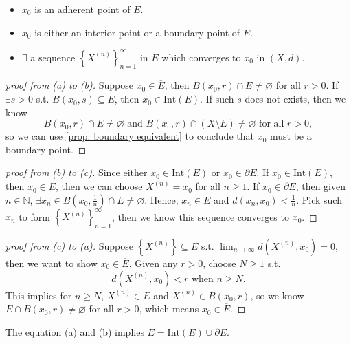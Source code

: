 \begin{proposition}[TFAE]
    \vphantom{text}
    \begin{itemize}
        \item [(a)] \(x_0\) is an adherent point of \(E\). 
        \item [(b)] \(x_0\) is either an interior point or a boundary point of \(E\). 
        \item [(c)] \(\exists \) a sequence \(\left\{ X^{(n)} \right\}_{n=1}^{\infty}  \) in \(E\) which converges to \(x_0\) in \((X, d)\).        
    \end{itemize}
\end{proposition}
\begin{proof}[proof from (a) to (b)]
    Suppose \(x_0 \in \overline{E} \), then \(B(x_0, r) \cap E \neq \varnothing \) for all \(r > 0\). If \(\exists s > 0\) s.t. \(B(x_0, s) \subseteq E\), then \(x_0 \in \mathrm{Int}(E)\). If such \(s\) does not exists, then we know
    \[
        B(x_0, r) \cap E \neq \varnothing \text{ and } B(x_0, r) \cap (X \setminus E) \neq \varnothing \text{ for all } r>0,
    \]
    so we can use \autoref{prop: boundary equivalent} to conclude that \(x_0\) must be a boundary point.        
\end{proof}
\begin{proof}[proof from (b) to (c)]
    Since either \(x_0 \in \mathrm{Int}(E) \) or \(x_0 \in \partial E\). If \(x_0 \in \mathrm{Int}(E) \), then \(x_0 \in E\), then we can choose \(X^{(n)} = x_0\) for all \(n \ge 1\). If \(x_0 \in \partial E\), then given \(n \in \mathbb{N} \), \(\exists x_n \in B\left( x_0, \frac{1}{n} \right) \cap E \neq \varnothing \). Hence, \(x_n \in E\) and \(d(x_n, x_0) < \frac{1}{n}\). Pick such \(x_n\) to form \(\left\{ X^{(n)} \right\}_{n=1}^{\infty}  \), then we know this sequence converges to \(x_0\).       
\end{proof}
\begin{proof}[proof from (c) to (a)]
    Suppose \(\left\{ X^{(n)} \right\}  \subseteq E\) s.t. \(\lim_{n \to \infty} d\left( X^{(n)}, x_0 \right) = 0  \), then we want to show \(x_0 \in \overline{E} \). Given any \(r > 0\), choose \(N \ge 1\) s.t. 
    \[
        d \left( X^{(n)}, x_0 \right) < r \text{ when } n \ge N. 
    \]     
    This implies for \(n \ge N\), \(X^{(n)} \in E\) and \(X^{(n)} \in B(x_0, r)\), so we know \(E \cap B(x_0, r) \neq \varnothing \) for all \(r > 0\), which means \(x_0 \in \overline{E} \).   
\end{proof}

\begin{remark}
    The equation (a) and (b) implies \(\overline{E} = \mathrm{Int}(E) \cup \partial E  \). 
\end{remark}

